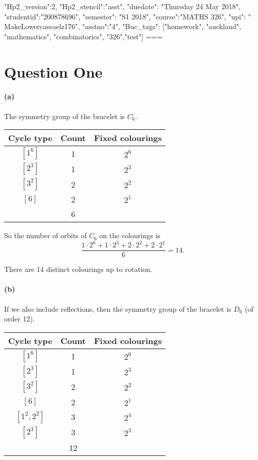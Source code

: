 {"Hp2_version":2, "Hp2_stencil":"asst",
 "duedate": "Thursday 24 May 2018", "studentid":"200878696",
 "semester": "S1 2018", "course":"MATHS 326", "upi": "\\MakeLowercase{aelz176}",
 "asstno":"4", "Buc_tags": ["homework", "auckland", "mathematics", "combinatorics", "326","test"]}
===
\section*{Question One}
\paragraph{(a)}
The symmetry group of the bracelet is $ C_6 $.
\begin{center}\begin{tabular}{|c|c|c|}\hline
  \textbf{Cycle type} & \textbf{Count} & \textbf{Fixed colourings}\\\hline
  $[1^6]$ & 1 & $ 2^6 $\\
  $[2^3]$ & 1 & $ 2^3 $\\
  $[3^2]$ & 2 & $ 2^2 $\\
  $[6]$ & 2 & $ 2^1 $\\\hline
   & 6 &\\\hline
\end{tabular}\end{center}

So the number of orbits of $ C_6 $ on the colourings is
\begin{displaymath}
  \frac{1 \cdot 2^6 + 1 \cdot 2^3 + 2 \cdot 2^2 + 2 \cdot 2^1}{6} = 14.
\end{displaymath}

There are 14 distinct colourings up to rotation.

\paragraph{(b)}
If we also include reflections, then the symmetry group of the bracelet is $ D_6 $ (of order 12).
\begin{center}\begin{tabular}{|c|c|c|}\hline
  \textbf{Cycle type} & \textbf{Count} & \textbf{Fixed colourings}\\\hline
  $[1^6]$ & 1 & $ 2^6 $\\
  $[2^3]$ & 1 & $ 2^3 $\\
  $[3^2]$ & 2 & $ 2^2 $\\
  $[6]$ & 2 & $ 2^1 $\\\hline
  $[1^2,2^2] $ & 3 & $ 2^4 $\\
  $[2^3] $ & 3 & $ 2^3 $\\\hline
   & 12 &\\\hline
\end{tabular}\end{center}


